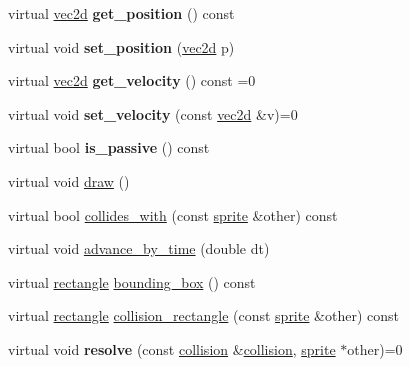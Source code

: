 \begin{DoxyCompactItemize}
virtual \hyperlink{classcsis3700_1_1vec2d}{vec2d} {\bfseries get\+\_\+position} () const
\item 
\mbox{\label{classcsis3700_1_1sprite_a433b1dbe4695990e42490d12d1bfac68}} 
virtual void {\bfseries set\+\_\+position} (\hyperlink{classcsis3700_1_1vec2d}{vec2d} p)
\item 
\mbox{\label{classcsis3700_1_1sprite_a947c4b01559cbcd9c4dffbc6b39c6fbf}} 
virtual \hyperlink{classcsis3700_1_1vec2d}{vec2d} {\bfseries get\+\_\+velocity} () const =0
\item 
\mbox{\label{classcsis3700_1_1sprite_a3c43d72d94f5428d06d6f01b8753abe9}} 
virtual void {\bfseries set\+\_\+velocity} (const \hyperlink{classcsis3700_1_1vec2d}{vec2d} \&v)=0
\item 
\mbox{\label{classcsis3700_1_1sprite_a498d7ab34e5f0367b34ac8355a6b428f}} 
virtual bool {\bfseries is\+\_\+passive} () const
\item 
virtual void \hyperlink{classcsis3700_1_1sprite_a6a69657522664635f116e05648792555}{draw} ()
\item 
virtual bool \hyperlink{classcsis3700_1_1sprite_ac3092a26409694577c92ba6d9831c90a}{collides\+\_\+with} (const \hyperlink{classcsis3700_1_1sprite}{sprite} \&other) const
\item 
virtual void \hyperlink{classcsis3700_1_1sprite_ac4d932bda87ce98a36579de3e1392a8f}{advance\+\_\+by\+\_\+time} (double dt)
\item 
virtual \hyperlink{classcsis3700_1_1rectangle}{rectangle} \hyperlink{classcsis3700_1_1sprite_a2ff6edefbdab7f1b49366bed16bfa6e5}{bounding\+\_\+box} () const
\item 
virtual \hyperlink{classcsis3700_1_1rectangle}{rectangle} \hyperlink{classcsis3700_1_1sprite_a54b72f8172133a7099ea2c73db23b4b2}{collision\+\_\+rectangle} (const \hyperlink{classcsis3700_1_1sprite}{sprite} \&other) const
\item 
\mbox{\label{classcsis3700_1_1sprite_a4bf20253e1bc1825bfe73cdfcbb532d2}} 
virtual void {\bfseries resolve} (const \hyperlink{classcsis3700_1_1collision}{collision} \&\hyperlink{classcsis3700_1_1collision}{collision}, \hyperlink{classcsis3700_1_1sprite}{sprite} $\ast$other)=0
\end{DoxyCompactItemize}
